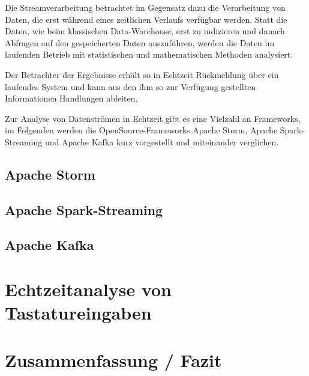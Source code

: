 \documentclass[a4paper,11pt]{scrartcl}
\begin{document}
Die Streamverarbeitung betrachtet im Gegensatz dazu die Verarbeitung von Daten,
die erst während eines zeitlichen Verlaufs verfügbar werden. Statt die Daten,
wie beim klassischen Data-Warehouse, erst zu indizieren und danach Abfragen auf
den gespeicherten Daten auszuführen, werden die Daten im laufenden Betrieb mit
statistischen und mathematischen Methoden analysiert.

Der Betrachter der Ergebnisse erhält so in Echtzeit Rückmeldung über ein
laufendes System und kann aus den ihm so zur Verfügung gestellten Informationen
Handlungen ableiten.


Zur Analyse von Datenströmen in Echtzeit gibt es eine Vielzahl an Frameworks,
im Folgenden werden die OpenSource-Frameworks Apache Storm, Apache
Spark-Streaming und Apache Kafka kurz vorgestellt und miteinander verglichen.



\subsection{Apache Storm}
\subsection{Apache Spark-Streaming}
\subsection{Apache Kafka}

\section{Echtzeitanalyse von Tastatureingaben}


\section{Zusammenfassung / Fazit}
\end{document}
